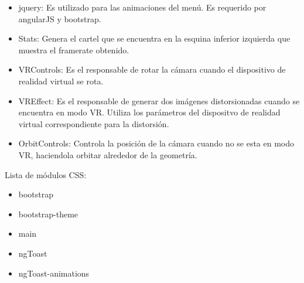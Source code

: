 \documentclass[12pt]{article}
\begin{document}
\begin{itemize}
\item jquery: Es utilizado para las animaciones del menú. Es requerido por angularJS y bootstrap.
\item Stats: Genera el cartel que se encuentra en la esquina inferior izquierda que muestra el framerate obtenido.
\item VRControls: Es el responsable de rotar la cámara cuando el dispositivo de realidad virtual se rota.
\item VREffect: Es el responsable de generar dos imágenes distorsionadas cuando se encuentra en modo VR. Utiliza los parámetros del dispositvo de realidad virtual correspondiente para la distorsión.
\item OrbitControls: Controla la posición de la cámara cuando no se esta en modo VR, haciendola orbitar alrededor de la geometría.
\end{itemize}
Lista de módulos CSS:
\begin{itemize}
\item bootstrap
\item bootstrap-theme
\item main
\item ngToast
\item ngToast-animations
\end{itemize}
\end{document}
